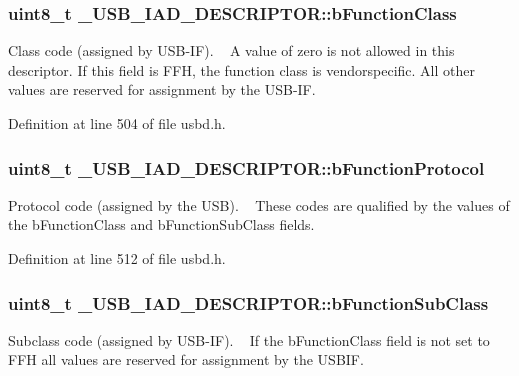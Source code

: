 \subsubsection[{\texorpdfstring{b\+Function\+Class}{bFunctionClass}}]{\setlength{\rightskip}{0pt plus 5cm}uint8\+\_\+t \+\_\+\+U\+S\+B\+\_\+\+I\+A\+D\+\_\+\+D\+E\+S\+C\+R\+I\+P\+T\+O\+R\+::b\+Function\+Class}\hypertarget{struct__USB__IAD__DESCRIPTOR_a4395c6765bf418652bcf73626731518b}{}\label{struct__USB__IAD__DESCRIPTOR_a4395c6765bf418652bcf73626731518b}
Class code (assigned by U\+S\+B-\/\+IF). ~\newline
A value of zero is not allowed in this descriptor. If this field is F\+FH, the function class is vendorspecific. All other values are reserved for assignment by the U\+S\+B-\/\+IF. 

Definition at line 504 of file usbd.\+h.

\subsubsection[{\texorpdfstring{b\+Function\+Protocol}{bFunctionProtocol}}]{\setlength{\rightskip}{0pt plus 5cm}uint8\+\_\+t \+\_\+\+U\+S\+B\+\_\+\+I\+A\+D\+\_\+\+D\+E\+S\+C\+R\+I\+P\+T\+O\+R\+::b\+Function\+Protocol}\hypertarget{struct__USB__IAD__DESCRIPTOR_ab0aa68806b463f0ce4ffdcfb5c1bbba4}{}\label{struct__USB__IAD__DESCRIPTOR_ab0aa68806b463f0ce4ffdcfb5c1bbba4}
Protocol code (assigned by the U\+SB). ~\newline
These codes are qualified by the values of the b\+Function\+Class and b\+Function\+Sub\+Class fields. 

Definition at line 512 of file usbd.\+h.

\subsubsection[{\texorpdfstring{b\+Function\+Sub\+Class}{bFunctionSubClass}}]{\setlength{\rightskip}{0pt plus 5cm}uint8\+\_\+t \+\_\+\+U\+S\+B\+\_\+\+I\+A\+D\+\_\+\+D\+E\+S\+C\+R\+I\+P\+T\+O\+R\+::b\+Function\+Sub\+Class}\hypertarget{struct__USB__IAD__DESCRIPTOR_ace36407d116b50a76320813cd2174a8c}{}\label{struct__USB__IAD__DESCRIPTOR_ace36407d116b50a76320813cd2174a8c}
Subclass code (assigned by U\+S\+B-\/\+IF). ~\newline
If the b\+Function\+Class field is not set to F\+FH all values are reserved for assignment by the U\+S\+B\+IF. 

